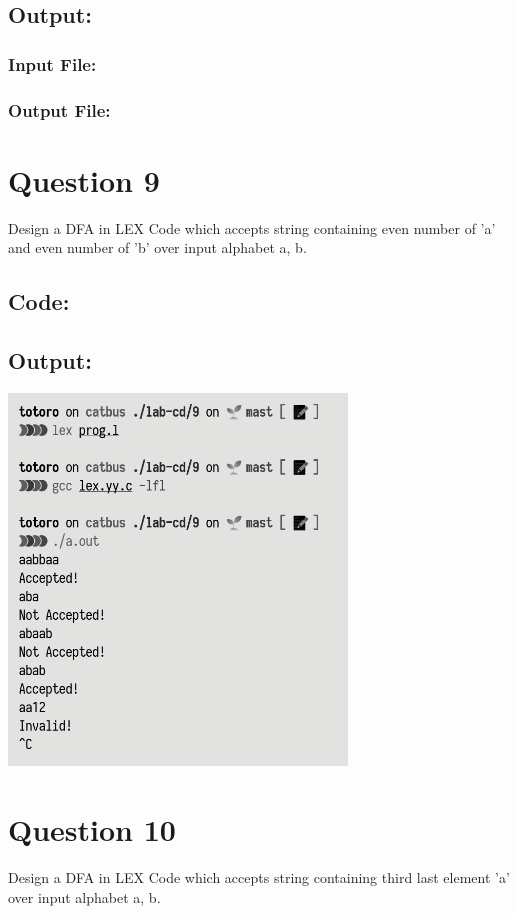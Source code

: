 \documentclass{article}
\begin{document}
\subsection*{Output:}
\subsubsection*{Input File:}

\subsubsection*{Output File:}


\newpage
\section*{Question 9}
Design a DFA in LEX Code which accepts string containing even 
number of 'a' and even number of 'b' over input alphabet {a, b}.
\subsection*{Code:}

\newpage
\subsection*{Output:}
\begin{center}
  \includegraphics[width=9cm]{9/out.png}
\end{center}

\newpage
\section*{Question 10}
Design a DFA in LEX Code which accepts string containing third 
last element 'a' over input alphabet {a, b}.
\end{document}
